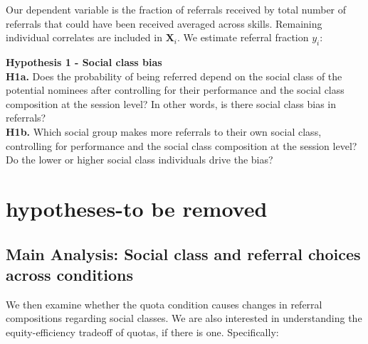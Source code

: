 \documentclass[11pt,a4paper,oneside]{article}
\begin{document}
Our dependent variable is the fraction of referrals received by total number of referrals that could have been received averaged across skills. Remaining individual correlates are included in $\mathbf{X}_{i}$. We estimate referral fraction $y_{i}$: 






\noindent\textbf{Hypothesis 1 - Social class bias}\\
\noindent\textbf{H1a.} Does the probability of being referred depend on the social class of the potential nominees after controlling for their performance and the social class composition at the session level? In other words, is there social class bias in referrals?\\
\noindent\textbf{H1b.} Which social group makes more referrals to their own social class, controlling for performance and the social class composition at the session level? Do the lower or higher social class individuals drive the bias?

\section{hypotheses-to be removed}
\subsection{Main Analysis: Social class and referral choices across conditions}
We then examine whether the quota condition causes changes in referral compositions regarding social classes. We are also interested in understanding the equity-efficiency tradeoff of quotas, if there is one. Specifically:\\
\end{document}
